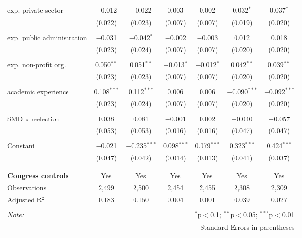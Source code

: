 \documentclass{article}
\begin{document}
\begin{table}[!htbp]
\begin{tabular}{@{\extracolsep{5pt}}lcccccc}
 exp. private sector & $-$0.012 & $-$0.022 & 0.003 & 0.002 & 0.032$^{*}$ & 0.037$^{*}$ \\ 
  & (0.022) & (0.023) & (0.007) & (0.007) & (0.019) & (0.020) \\ 
  & & & & & & \\ 
 exp. public administration & $-$0.031 & $-$0.042$^{*}$ & $-$0.002 & $-$0.003 & 0.012 & 0.018 \\ 
  & (0.023) & (0.024) & (0.007) & (0.007) & (0.020) & (0.020) \\ 
  & & & & & & \\ 
 exp. non-profit org. & 0.050$^{**}$ & 0.051$^{**}$ & $-$0.013$^{*}$ & $-$0.012$^{*}$ & 0.042$^{**}$ & 0.039$^{**}$ \\ 
  & (0.023) & (0.023) & (0.007) & (0.007) & (0.020) & (0.020) \\ 
  & & & & & & \\ 
 academic experience & 0.108$^{***}$ & 0.112$^{***}$ & 0.006 & 0.006 & $-$0.090$^{***}$ & $-$0.092$^{***}$ \\ 
  & (0.023) & (0.024) & (0.007) & (0.007) & (0.020) & (0.020) \\ 
  & & & & & & \\ 
 SMD x reelection & 0.038 & 0.081 & $-$0.001 & 0.002 & $-$0.040 & $-$0.057 \\ 
  & (0.053) & (0.053) & (0.016) & (0.016) & (0.047) & (0.047) \\ 
  & & & & & & \\ 
 Constant & $-$0.021 & $-$0.235$^{***}$ & 0.098$^{***}$ & 0.079$^{***}$ & 0.323$^{***}$ & 0.424$^{***}$ \\ 
  & (0.047) & (0.042) & (0.014) & (0.013) & (0.041) & (0.037) \\ 
  & & & & & & \\ 
\hline \\[-1.8ex] 
\textbf{Congress controls} & Yes & Yes & Yes & Yes & Yes & Yes \\ 
Observations & 2,499 & 2,500 & 2,454 & 2,455 & 2,308 & 2,309 \\ 
Adjusted R$^{2}$ & 0.183 & 0.150 & 0.004 & 0.001 & 0.039 & 0.027 \\ 
\hline 
\hline \\[-1.8ex] 
\textit{Note:}  & \multicolumn{6}{r}{$^{*}$p$<$0.1; $^{**}$p$<$0.05; $^{***}$p$<$0.01} \\ 
 & \multicolumn{6}{r}{Standard Errors in parentheses} \\ 
\end{tabular} 
\end{table} 
\end{document}
